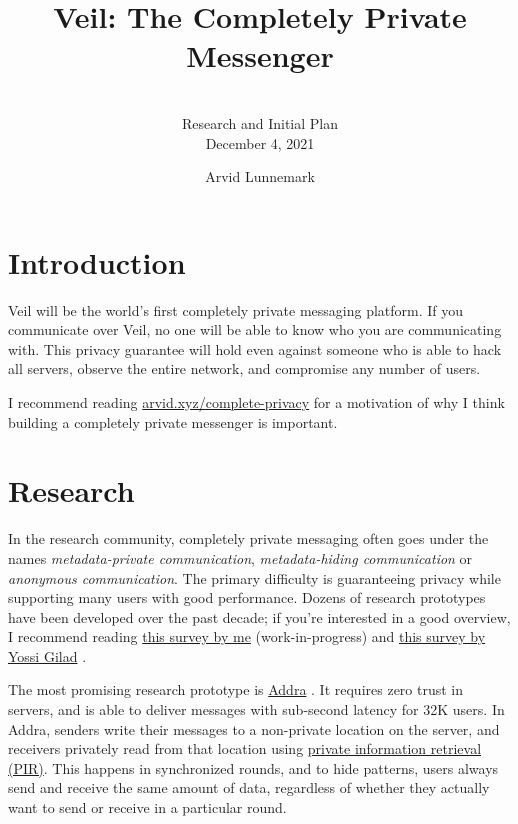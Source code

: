 \documentclass[sigconf, nonacm, balance=false, natbib=false, screen]{acmart}
\title{Veil: The Completely Private Messenger}
\subtitle{\vspace{-5px} \\ Research and Initial Plan \\ December 4, 2021}
\author{Arvid Lunnemark}
\begin{document}
\maketitle

\section{Introduction}

Veil will be the world's first completely private messaging platform. If you communicate over Veil, no one will be able to know who you are communicating with. This privacy guarantee will hold even against someone who is able to hack all servers, observe the entire network, and compromise any number of users.

I recommend reading \href{https://arvid.xyz/complete-privacy}{arvid.xyz/complete-privacy} \cite{arvid} for a motivation of why I think building a completely private messenger is important.

\section{Research}

In the research community, completely private messaging often goes under the names \textit{metadata-private communication}, \textit{metadata-hiding communication} or \textit{anonymous communication}. The primary difficulty is guaranteeing privacy while supporting many users with good performance. Dozens of research prototypes have been developed over the past decade; if you're interested in a good overview, I recommend reading \href{https://arvid.xyz/ac-research}{this survey by me} \cite{arvid2021survey} (work-in-progress) and \href{http://www.mit.edu/~yossigi/metadata.pdf}{this survey by Yossi Gilad} \cite{gilad2019metadata}. 

The most promising research prototype is \href{https://www.usenix.org/conference/osdi21/presentation/ahmad}{Addra} \cite{ahmad2021addra}. It requires zero trust in servers, and is able to deliver messages with sub-second latency for 32K users. 
In Addra, senders write their messages to a non-private location on the server, and receivers privately read from that location using \href{https://en.wikipedia.org/wiki/Private_information_retrieval}{private information retrieval (PIR)}. This happens in synchronized rounds, and to hide patterns, users always send and receive the same amount of data, regardless of whether they actually want to send or receive in a particular round.
\end{document}
